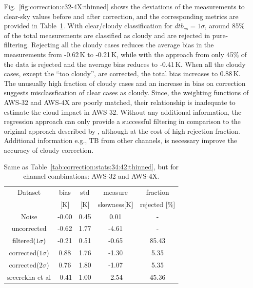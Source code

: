 \documentclass[12pt]{article}
\begin{document}
Fig.~\ref{fig:correction:c32-4X:thinned} shows the deviations of the
measurements to clear-sky values before and after correction, and the
corresponding metrics are provided in Table~\ref{tab:correction:stats:32:4X}.
With clear/cloudy classification for $dtb_{cs} = 1\sigma$, around 85\% of the total measurements are classified as cloudy and are rejected in pure-filtering. Rejecting all the cloudy cases reduces the average bias in the measurements from -0.62\,K to -0.21\,K,  while with the approach from \citet{rekha2012potential} only 45\% of the data is rejected and the average bias reduces to  -0.41\,K. When all the cloudy cases, except the ``too cloudy'', are corrected, the total bias increases to 0.88\,K. The unusually high fraction of cloudy cases and an increase in bias on correction suggests misclassfication of clear cases as cloudy. 
Since, the weighting functions of AWS-32 and AWS-4X are poorly matched, their relationship is inadequate to estimate the cloud impact in AWS-32. Without any additional information, the regression approach can only provide a successful filtering in comparison to the original approach described by \citet{rekha2012potential},  although at the cost of high rejection fraction. Additional information e.g., TB from other channels, is necessary improve the accuracy of cloudy correction.

%
\begin{table}[!h]
	\centering
	\begin{tabular}[b]{c|c|c|c|c}
		Dataset  		  &   bias &   std &   measure & fraction \\
						&   [K]  &   [K] & skewness[K] 		& rejected [\%]\\
		\hline
Noise             		&  -0.00 &  0.45 &               0.01 &                - \\
uncorrected       		&  -0.62 &  1.77 &              -4.61 &                - \\
filtered($1\sigma$)  	&  -0.21 &  0.51 &              -0.65 &               85.43 \\
corrected($1\sigma$) 	&   0.88 &  1.76 &              -1.30 &                5.35 \\
corrected($2\sigma$) 	&   0.76 &  1.80 &              -1.07 &                5.35 \\
sreerekha et al   		&  -0.41 &  1.00 &              -2.54 &               45.36 \\
		\hline
	\end{tabular}
	\caption{Same as Table~\ref{tab:correction:stats:34:42:thinned}, but for channel combinations: AWS-32 and AWS-4X.   }
	\label{tab:correction:stats:32:4X}
\end{table}
\end{document}
